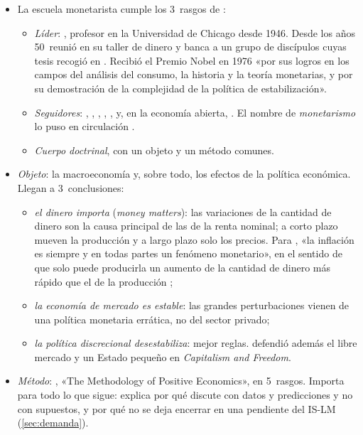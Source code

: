 \documentclass[11pt]{article}
\begin{document}
\begin{itemize}
\item La escuela monetarista cumple los 3~rasgos de :
  \begin{itemize}
  \item \emph{Líder}: , profesor en la Universidad de Chicago desde 1946. Desde los años 50~reunió en su taller de dinero y banca a un grupo de discípulos cuyas tesis recogió en \textcite{Friedman1956Quantity}. Recibió el Premio Nobel en 1976 «por sus logros en los campos del análisis del consumo, la historia y la teoría monetarias, y por su demostración de la complejidad de la política de estabilización»\nocite{Nobel1976Friedman}.
  \item \emph{Seguidores}: , , , , ,  y, en la economía abierta, \nocite{SnowdonVane2005Modern}. El nombre de \emph{monetarismo} lo puso en circulación \textcite{Brunner1968Role}.
  \item \emph{Cuerpo doctrinal}, con un objeto y un método comunes.
  \end{itemize}
\item \emph{Objeto}: la macroeconomía y, sobre todo, los efectos de la política económica. Llegan a 3~conclusiones:
  \begin{itemize}
  \item \emph{el dinero importa} (\emph{money matters}): las variaciones de la cantidad de dinero son la causa principal de las de la renta nominal; a corto plazo mueven la producción y a largo plazo solo los precios. Para \textcite{Friedman1963Inflation}, «la inflación es siempre y en todas partes un fenómeno monetario», en el sentido de que solo puede producirla un aumento de la cantidad de dinero más rápido que el de la producción\nocite{Friedman1970Counter} ;
  \item \emph{la economía de mercado es estable}: las grandes perturbaciones vienen de una política monetaria errática, no del sector privado;
  \item \emph{la política discrecional desestabiliza}: mejor reglas.  defendió además el libre mercado y un Estado pequeño en \emph{Capitalism and Freedom}\nocite{Friedman1962Capitalism}.
  \end{itemize}
\item \emph{Método}: \textcite{Friedman1953Methodology}, «The Methodology of Positive Economics», en 5~rasgos. Importa para todo lo que sigue: explica por qué  discute con datos y predicciones y no con supuestos, y por qué no se deja encerrar en una pendiente del IS-LM (\ref{sec:demanda}).

\end{itemize}
\end{document}
